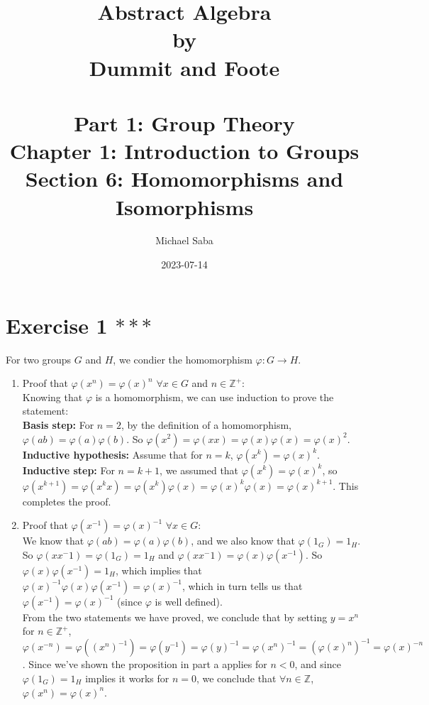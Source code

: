 \documentclass[12pt]{article}
\title{%
    \Huge Abstract Algebra \\
    \large by \\
    \Large Dummit and Foote \\~\\
    \huge Part 1: Group Theory \\
    \LARGE Chapter 1: Introduction to Groups \\
    \Large Section 6: Homomorphisms and Isomorphisms
}
\date{2023-07-14}
\author{Michael Saba}
\newcommand{\Z}{\mathbb{Z}}
\begin{document}
    \maketitle
    \newpage


    \section*{Exercise 1 $***$}
    For two groups $G$ and $H$,
    we condier the homomorphism $\varphi: G \to H$. \\ 
    \begin{enumerate}[label=\textbf{\alph*.}]
        \item 
            Proof that $\varphi(x^n) = \varphi(x)^n$ $\forall x \in G$
            and $n \in \Z^+$: \\
            Knowing that $\varphi$ is a homomorphism,
            we can use induction to prove the statement: \\
            \textbf{Basis step:}
            For $n = 2$,
            by the definition of a homomorphism,
            $\varphi(ab) = \varphi(a)\varphi(b)$.
            So $\varphi(x^2) = \varphi(xx)
            = \varphi(x)\varphi(x)
            = \varphi(x)^2$. \\
            \textbf{Inductive hypothesis:}
            Assume that for $n = k$, $\varphi(x^k) = \varphi(x)^k$. \\ 
            \textbf{Inductive step:}
            For $n = k+1$,
            we assumed that $\varphi(x^k) = \varphi(x)^k$,
            so $\varphi(x^{k+1}) = \varphi(x^kx)
            = \varphi(x^k)\varphi(x)
            = \varphi(x)^k\varphi(x)
            = \varphi(x)^{k+1}$.
            This completes the proof.
        \item
            Proof that $\varphi(x^{-1}) = \varphi(x)^{-1}$
            $\forall x \in G$: \\
            We know that $\varphi(ab) = \varphi(a)\varphi(b)$,
            and we also know that $\varphi(1_G) = 1_H$.
            So $\varphi(xx^-1) = \varphi(1_G) = 1_H$
            and $\varphi(xx^-1) = \varphi(x)\varphi(x^{-1})$.
            So $\varphi(x)\varphi(x^{-1}) = 1_H$,
            which implies that
            $\varphi(x)^{-1}\varphi(x)\varphi(x^{-1}) = \varphi(x)^{-1}$,
            which in turn tells us that
            $\varphi(x^{-1}) = \varphi(x)^{-1}$
            (since $\varphi$ is well defined). \\
            From the two statements we have proved,
            we conclude that by setting $y = x^n$ for $n \in \Z^+$,
            $ \varphi(x^{-n}) = \varphi((x^n)^{-1})
            = \varphi(y^{-1})
            = \varphi(y)^{-1}
            = \varphi(x^n)^{-1}
            = (\varphi(x)^n)^{-1}
            = \varphi(x)^{-n}$.
            Since we've shown the proposition in part a applies for $n < 0$,
            and since $\varphi(1_G) = 1_H$ implies it works for
            $n = 0$, we conclude that $\forall n \in \Z$, 
            $\varphi(x^n) = \varphi(x)^n$.
    \end{enumerate}
\end{document}
